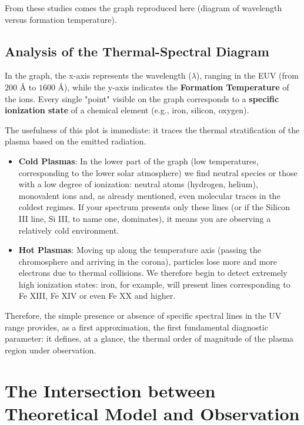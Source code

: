 From these studies comes the graph reproduced here (diagram of wavelength versus formation temperature).

    \subsection{Analysis of the Thermal-Spectral Diagram}
    
    In the graph, the x-axis represents the wavelength ($\lambda$), ranging in the EUV (from $200\text{ \AA}$ to $1600\text{ \AA}$), while the y-axis indicates the \textbf{Formation Temperature} of the ions.
    Every single "point" visible on the graph corresponds to a \textbf{specific ionization state} of a chemical element (e.g., iron, silicon, oxygen).
    
    The usefulness of this plot is immediate: it traces the thermal stratification of the plasma based on the emitted radiation.
    \begin{itemize}
        \item \textbf{Cold Plasmas}: In the lower part of the graph (low temperatures, corresponding to the lower solar atmosphere) we find neutral species or those with a low degree of ionization: neutral atoms (hydrogen, helium), monovalent ions and, as already mentioned, even molecular traces in the coldest regimes. If your spectrum presents only these lines (or if the Silicon III line, Si III, to name one, dominates), it means you are observing a relatively cold environment.
        \item \textbf{Hot Plasmas}: Moving up along the temperature axis (passing the chromosphere and arriving in the corona), particles lose more and more electrons due to thermal collisions. We therefore begin to detect extremely high ionization states: iron, for example, will present lines corresponding to Fe XIII, Fe XIV or even Fe XX and higher.
    \end{itemize}
    
    Therefore, the simple presence or absence of specific spectral lines in the UV range provides, as a first approximation, the first fundamental diagnostic parameter: it defines, at a glance, the thermal order of magnitude of the plasma region under observation.

    \section{The Intersection between Theoretical Model and Observation}

